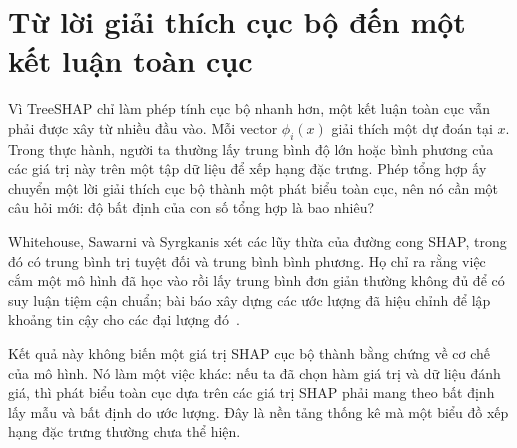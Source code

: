 \section{Từ lời giải thích cục bộ đến một kết luận toàn cục}
\label{sec:ch04-tu-cuc-bo-den-toan-cuc}

Vì TreeSHAP chỉ làm phép tính cục bộ nhanh hơn, một kết luận toàn cục vẫn phải
được xây từ nhiều đầu vào. Mỗi vector $\phi_i(x)$ giải thích một dự đoán tại $x$. Trong thực hành, người
ta thường lấy trung bình độ lớn hoặc bình phương của các giá trị này trên một
tập dữ liệu để xếp hạng đặc trưng. Phép tổng hợp ấy chuyển một lời giải thích
cục bộ thành một phát biểu toàn cục, nên nó cần một câu hỏi mới: độ bất định
của con số tổng hợp là bao nhiêu?

Whitehouse, Sawarni và Syrgkanis xét các lũy thừa của đường cong SHAP, trong
đó có trung bình trị tuyệt đối và trung bình bình phương. Họ chỉ ra rằng việc
cắm một mô hình đã học vào rồi lấy trung bình đơn giản thường không đủ để có
suy luận tiệm cận chuẩn; bài báo xây dựng các ước lượng đã hiệu chỉnh để lập
khoảng tin cậy cho các đại lượng đó~\autocite{p19shapinference}.

Kết quả này không biến một giá trị SHAP cục bộ thành bằng chứng về cơ chế của
mô hình. Nó làm một việc khác: nếu ta đã chọn hàm giá trị và dữ liệu đánh giá,
thì phát biểu toàn cục dựa trên các giá trị SHAP phải mang theo bất định lấy
mẫu và bất định do ước lượng. Đây là nền tảng thống kê mà một biểu đồ xếp hạng
đặc trưng thường chưa thể hiện.

%
%

